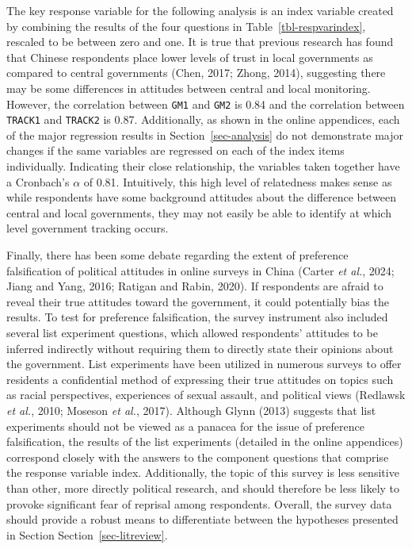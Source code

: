\documentclass[
  letterpaper,
  DIV=11,
  numbers=noendperiod]{scrartcl}
\begin{document}
The key response variable for the following analysis is an index
variable created by combining the results of the four questions in
Table~\ref{tbl-respvarindex}, rescaled to be between zero and one. It is
true that previous research has found that Chinese respondents place
lower levels of trust in local governments as compared to central
governments (Chen, 2017; Zhong, 2014), suggesting there may be some
differences in attitudes between central and local monitoring. However,
the correlation between \texttt{GM1} and \texttt{GM2} is 0.84 and the
correlation between \texttt{TRACK1} and \texttt{TRACK2} is 0.87.
Additionally, as shown in the online appendices, each of the major
regression results in Section~\ref{sec-analysis} do not demonstrate
major changes if the same variables are regressed on each of the index
items individually. Indicating their close relationship, the variables
taken together have a Cronbach's \(\alpha\) of 0.81. Intuitively, this
high level of relatedness makes sense as while respondents have some
background attitudes about the difference between central and local
governments, they may not easily be able to identify at which level
government tracking occurs.

Finally, there has been some debate regarding the extent of preference
falsification of political attitudes in online surveys in China (Carter
\emph{et al.}, 2024; Jiang and Yang, 2016; Ratigan and Rabin, 2020). If
respondents are afraid to reveal their true attitudes toward the
government, it could potentially bias the results. To test for
preference falsification, the survey instrument also included several
list experiment questions, which allowed respondents' attitudes to be
inferred indirectly without requiring them to directly state their
opinions about the government. List experiments have been utilized in
numerous surveys to offer residents a confidential method of expressing
their true attitudes on topics such as racial perspectives, experiences
of sexual assault, and political views (Redlawsk \emph{et al.}, 2010;
Moseson \emph{et al.}, 2017). Although Glynn (2013) suggests that list
experiments should not be viewed as a panacea for the issue of
preference falsification, the results of the list experiments (detailed
in the online appendices) correspond closely with the answers to the
component questions that comprise the response variable index.
Additionally, the topic of this survey is less sensitive than other,
more directly political research, and should therefore be less likely to
provoke significant fear of reprisal among respondents. Overall, the
survey data should provide a robust means to differentiate between the
hypotheses presented in Section Section~\ref{sec-litreview}.
\end{document}
